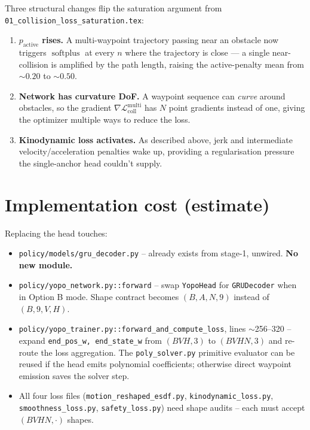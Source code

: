 \documentclass[11pt]{article}
\newcommand{\softplus}{\operatorname{softplus}}
\begin{document}
Three structural changes flip the saturation argument from
\texttt{01\_collision\_loss\_saturation.tex}:

\begin{enumerate}
  \item \textbf{$p_{\text{active}}$ rises.} A multi-waypoint trajectory passing
        near an obstacle now triggers $\softplus$ at every $n$ where the
        trajectory is close --- a single near-collision is amplified by the
        path length, raising the active-penalty mean from $\sim$$0.20$ to
        $\sim$$0.50$.
  \item \textbf{Network has curvature DoF.} A waypoint sequence can
        \emph{curve} around obstacles, so the gradient
        $\nabla \mathcal{L}_{\text{coll}}^{\text{multi}}$ has $N$ point gradients
        instead of one, giving the optimizer multiple ways to reduce the loss.
  \item \textbf{Kinodynamic loss activates.} As described above, jerk and
        intermediate velocity/acceleration penalties wake up, providing a
        regularisation pressure the single-anchor head couldn't supply.
\end{enumerate}

\section{Implementation cost (estimate)}

Replacing the head touches:
\begin{itemize}
  \item \texttt{policy/models/gru\_decoder.py} -- already exists from stage-1,
        unwired. \textbf{No new module.}
  \item \texttt{policy/yopo\_network.py::forward} -- swap \texttt{YopoHead}
        for \texttt{GRUDecoder} when in Option B mode. Shape contract becomes
        $(B, A, N, 9)$ instead of $(B, 9, V, H)$.
  \item \texttt{policy/yopo\_trainer.py::forward\_and\_compute\_loss}, lines
        $\sim$256--320 -- expand \texttt{end\_pos\_w, end\_state\_w} from
        $(BVH, 3)$ to $(BVH N, 3)$ and re-route the loss aggregation. The
        \texttt{poly\_solver.py} primitive evaluator can be reused if the head
        emits polynomial coefficients; otherwise direct waypoint emission saves
        the solver step.
  \item All four loss files (\texttt{motion\_reshaped\_esdf.py},
        \texttt{kinodynamic\_loss.py}, \texttt{smoothness\_loss.py},
        \texttt{safety\_loss.py}) need shape audits -- each must accept
        $(BVH N, \cdot)$ shapes.
\end{itemize}
\end{document}
